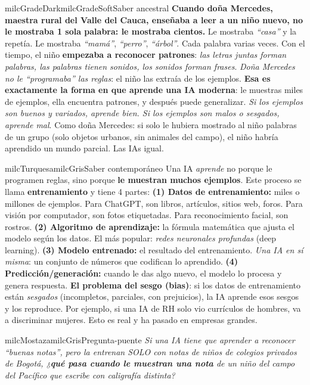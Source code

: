 \documentclass[11pt,letterpaper]{article}
\begin{document}
\begin{softbox}{milcGradeDark}{milcGradeSoft}{Saber ancestral}
\textbf{Cuando doña Mercedes, maestra rural del Valle del Cauca, enseñaba a leer a un niño nuevo, no le mostraba 1 sola palabra: le mostraba cientos.} Le mostraba \emph{``casa''} y la repetía. Le mostraba \emph{``mamá''}, \emph{``perro''}, \emph{``árbol''}. Cada palabra varias veces. Con el tiempo, el niño \textbf{empezaba a reconocer patrones}: \emph{las letras juntas forman palabras, las palabras tienen sonidos, los sonidos forman frases}. \emph{Doña Mercedes no le ``programaba'' las reglas}: el niño las extraía de los ejemplos. \textbf{Esa es exactamente la forma en que aprende una IA moderna}: le muestras miles de ejemplos, ella encuentra patrones, y después puede generalizar. \emph{Si los ejemplos son buenos y variados, aprende bien. Si los ejemplos son malos o sesgados, aprende mal}. Como doña Mercedes: si solo le hubiera mostrado al niño palabras de un grupo (solo objetos urbanos, sin animales del campo), el niño habría aprendido un mundo parcial. Las IAs igual.
\end{softbox}

\begin{softbox}{milcTurquesa}{milcGris}{Saber contemporáneo}
Una IA \emph{aprende} no porque le programen reglas, sino porque \textbf{le muestran muchos ejemplos}. Este proceso se llama \textbf{entrenamiento} y tiene 4 partes: \textbf{(1) Datos de entrenamiento:} miles o millones de ejemplos. Para ChatGPT, son libros, artículos, sitios web, foros. Para visión por computador, son fotos etiquetadas. Para reconocimiento facial, son rostros. \textbf{(2) Algoritmo de aprendizaje:} la fórmula matemática que ajusta el modelo según los datos. El más popular: \emph{redes neuronales profundas} (deep learning). \textbf{(3) Modelo entrenado:} el resultado del entrenamiento. \emph{Una IA en sí misma}: un conjunto de números que codifican lo aprendido. \textbf{(4) Predicción/generación:} cuando le das algo nuevo, el modelo lo procesa y genera respuesta. \textbf{El problema del sesgo (bias)}: si los datos de entrenamiento están \emph{sesgados} (incompletos, parciales, con prejuicios), la IA aprende esos sesgos y los reproduce. Por ejemplo, si una IA de RH solo vio currículos de hombres, va a discriminar mujeres. Esto es real y ha pasado en empresas grandes.
\end{softbox}

\begin{softbox}{milcMostaza}{milcGris}{Pregunta-puente}
\textit{Si una IA tiene que aprender a reconocer ``buenas notas'', pero la entrenan SOLO con notas de niños de colegios privados de Bogotá, ¿\textbf{qué pasa cuando le muestran una nota} de un niño del campo del Pacífico que escribe con caligrafía distinta?}
\end{softbox}
\end{document}

